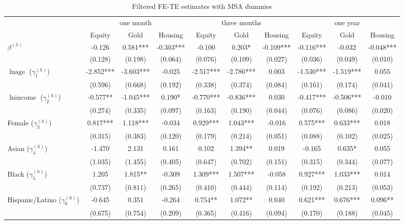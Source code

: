 \begin{table}[!h]\caption{Filtered FE-TE estimates with MSA dummies}\centering 
\begin{threeparttable} 
\begin{tabular}{|l|ccc|ccc|ccc|}\toprule 
& \multicolumn{3}{c}{one month} & \multicolumn{3}{c}{three months}&\multicolumn{3}{c}{one year}   \\  
 & Equity & Gold & Housing & Equity  & Gold & Housing & Equity & Gold & Housing \\\midrule 
$\beta^{(h)}$ & -0.126 & 0.581*** & -0.303*** & -0.100 & 0.203* & -0.109*** & -0.116*** & -0.032 & -0.048*** \\ 
 & (0.128) & (0.198) & (0.064)& (0.076) & (0.109) & (0.027)& (0.036) & (0.049) & (0.010) \\ 
$\ln \text{age}$ ($\gamma^{(h)}_1$) & -2.852*** & -3.603*** & -0.025 & -2.517*** & -2.786*** & 0.003 & -1.530*** & -1.519*** & 0.055 \\ 
 & (0.596) & (0.668) & (0.192)& (0.338) & (0.374) & (0.084)& (0.161) & (0.174) & (0.041) \\ 
$\ln \text{income}$ ($\gamma^{(h)}_2$) & -0.577** & -1.045*** & 0.190* & -0.770*** & -0.836*** & 0.030 & -0.417*** & -0.506*** & -0.010 \\ 
 & (0.274) & (0.335) & (0.097)& (0.163) & (0.190) & (0.044)& (0.076) & (0.086) & (0.020) \\ 
Female ($\gamma^{(h)}_3$) & 0.817*** & 1.118*** & -0.034 & 0.929*** & 1.043*** & -0.016 & 0.575*** & 0.633*** & 0.018 \\ 
 & (0.315) & (0.383) & (0.120)& (0.179) & (0.214) & (0.051)& (0.088) & (0.102) & (0.025) \\ 
Asian ($\gamma^{(h)}_4$) & -1.470 & 2.131 & 0.161 & 0.102 & 1.394** & 0.019 & -0.165 & 0.635* & 0.055 \\ 
 & (1.035) & (1.455) & (0.405)& (0.647) & (0.702) & (0.151)& (0.315) & (0.344) & (0.077) \\ 
Black ($\gamma^{(h)}_5$) & 1.205 & 1.815** & -0.309 & 1.309*** & 1.507*** & -0.058 & 0.927*** & 1.033*** & 0.014 \\ 
 & (0.737) & (0.811) & (0.265)& (0.410) & (0.444) & (0.114)& (0.192) & (0.213) & (0.053) \\ 
Hispanic/Latino ($\gamma^{(h)}_6$) & -0.645 & 0.351 & -0.264 & 0.754** & 1.072** & 0.040 & 0.621*** & 0.676*** & 0.096** \\ 
 & (0.675) & (0.754) & (0.209)& (0.365) & (0.416) & (0.094)& (0.170) & (0.188) & (0.045) \\ 

\end{tabular}
\end{threeparttable}
\end{table}
